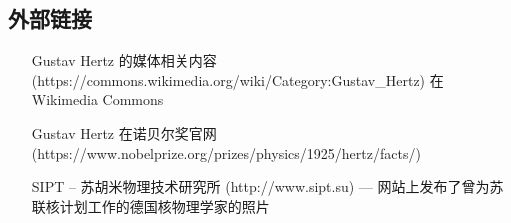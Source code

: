 \subsection{外部链接}
\begin{itemize}
\item [Gustav Hertz 的媒体相关内容](https://commons.wikimedia.org/wiki/Category:Gustav_Hertz) 在 Wikimedia Commons
\item [Gustav Hertz 在诺贝尔奖官网](https://www.nobelprize.org/prizes/physics/1925/hertz/facts/)
\item [SIPT – 苏胡米物理技术研究所](http://www.sipt.su) — 网站上发布了曾为苏联核计划工作的德国核物理学家的照片
\end{itemize}
